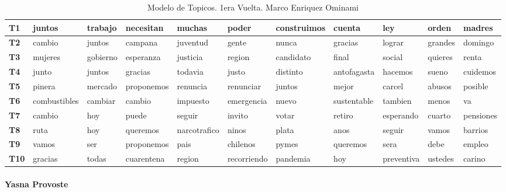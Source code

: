 \documentclass[
  10pt,
  letterpaper,
]{report}
\begin{document}
\begin{table}[!h]

\caption{\label{tab:Tabla3_meo}Modelo de Topicos. 1era Vuelta. Marco Enriquez Ominami}
\centering
\fontsize{6}{8}\selectfont
\begin{tabular}[t]{>{\raggedright\arraybackslash}p{0.08in}|>{\raggedright\arraybackslash}p{0.4in}|>{\raggedright\arraybackslash}p{0.4in}|>{\raggedright\arraybackslash}p{0.4in}|>{\raggedright\arraybackslash}p{0.4in}|>{\raggedright\arraybackslash}p{0.4in}|>{\raggedright\arraybackslash}p{0.4in}|>{\raggedright\arraybackslash}p{0.4in}|>{\raggedright\arraybackslash}p{0.4in}|>{\raggedright\arraybackslash}p{0.4in}|l}
\hline
T1 & juntos & trabajo & necesitan & muchas & poder & construimos & cuenta & ley & orden & madres\\
\hline
\textbf{T2} & cambio & juntos & campana & juventud & gente & nunca & gracias & lograr & grandes & domingo\\
\hline
\textbf{T3} & mujeres & gobierno & esperanza & justicia & region & candidato & final & social & quieres & renta\\
\hline
\textbf{T4} & junto & juntos & gracias & todavia & justo & distinto & antofagasta & hacemos & sueno & cuidemos\\
\hline
\textbf{T5} & pinera & mercado & proponemos & renuncia & renunciar & juntos & mejor & carcel & abusos & posible\\
\hline
\textbf{T6} & combustibles & cambiar & cambio & impuesto & emergencia & nuevo & sustentable & tambien & menos & va\\
\hline
\textbf{T7} & cambio & hoy & puede & seguir & invito & votar & retiro & esperando & cuarto & pensiones\\
\hline
\textbf{T8} & ruta & hoy & queremos & narcotrafico & ninos & plata & anos & seguir & vamos & barrios\\
\hline
\textbf{T9} & vamos & ser & proponemos & pais & chilenos & pymes & queremos & sera & debe & empleo\\
\hline
\textbf{T10} & gracias & todas & cuarentena & region & recorriendo & pandemia & hoy & preventiva & ustedes & carino\\
\hline
\end{tabular}
\end{table}

\hypertarget{yasna-provoste}{%
\paragraph{Yasna Provoste}\label{yasna-provoste}}
\end{document}
